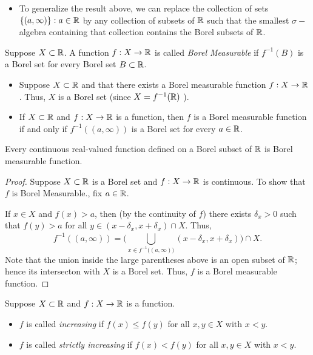\documentclass[11pt,a4paper]{book}
\begin{document}
\begin{itemize}
    \item To generalize the result above, we can replace the collection of sets \( \{ (a,\infty ) \} : a \in \mathbb{R}  \) by any collection of subsets of \( \mathbb{R}  \) such that the smallest \( \sigma- \)algebra containing that collection contains the Borel subsets of \( \mathbb{R}  \).
\end{itemize}

\begin{definition}
    Suppose \( X \subset \mathbb{R}  \). A function \( f: X \to \mathbb{R}  \) is called \textit{Borel Measurable}  if \( f^{-1}(B) \) is a Borel set for every Borel set \( B \subset \mathbb{R}  \).
\end{definition}

\begin{itemize}
    \item Suppose \( X \subset \mathbb{R}  \) and that there exists a Borel measurable function \( f: X \to \mathbb{R}  \). Thus, \( X  \) is a Borel set (since \( X = f^{-1}(\mathbb{R}) \) ).
    \item If \( X \subset \mathbb{R}  \) and \( f: X \to \mathbb{R}  \) is a function, then \( f  \) is a Borel measurable function if and only if \( f^{-1}((a,\infty )) \) is a Borel set for every \( a \in \mathbb{R}  \).
\end{itemize}

\begin{prop}
    Every continuous real-valued function defined on a Borel subset of \( \mathbb{R}  \) is Borel measurable function.
\end{prop}
\begin{proof}
Suppose \( X \subset \mathbb{R}  \) is a Borel set and \( f: X \to \mathbb{R}  \) is continuous. To show that \( f  \) is Borel Measurable., fix \( a \in \mathbb{R}  \).

If \( x \in X  \) and \( f(x) > a  \), then (by the continuity of \( f \)) there exists \( {\delta}_{x} > 0  \) such that \( f(y) > a  \) for all \( y \in (x - {\delta}_{x}, x + {\delta}_{x }) \cap X  \). Thus, 
\[  f^{-1}((a,\infty )) = \Big(  \bigcup_{ x \in f^{-1}\Big(  (a,\infty ) \Big) }^{  }  (x- {\delta}_{x}, x + {\delta}_{x}) \Big) \cap X. \]
Note that the union inside the large parentheses above is an open subset of \( \mathbb{R}  \); hence its intersecton with \( X  \) is a Borel set. Thus, \( f  \) is a Borel measurable function.
\end{proof}

\begin{definition}
    Suppose \( X \subset \mathbb{R}  \) and \( f: X \to \mathbb{R}  \) is a function.
    \begin{itemize}
        \item \( f  \) is called \textit{increasing} if \( f(x) \leq f(y) \) for all \( x,y \in X  \) with \( x < y  \).
        \item \( f \) is called \textit{strictly increasing} if \( f(x) < f(y)  \) for all \( x,y \in X  \) with \( x < y  \).
    \end{itemize}
\end{definition}
\end{document}
